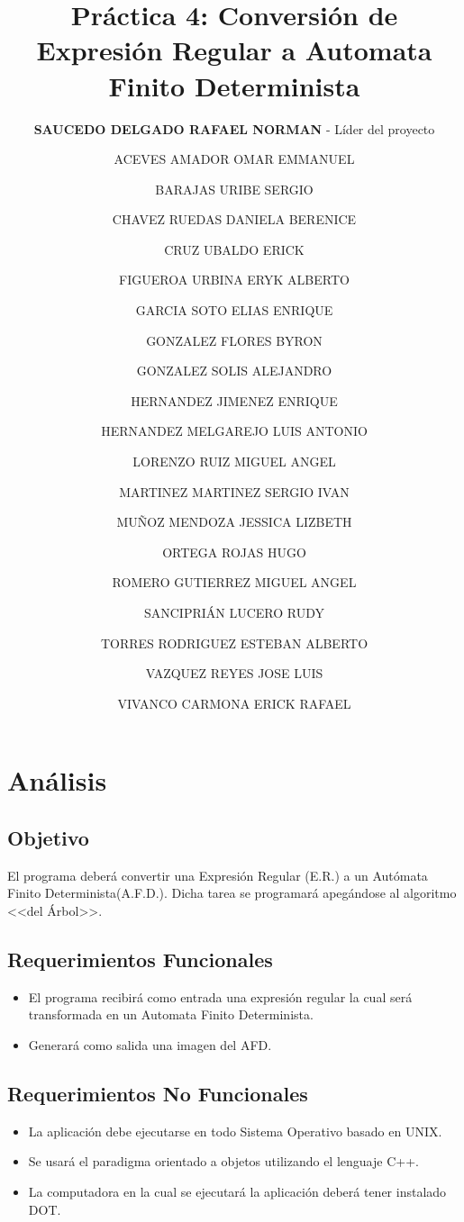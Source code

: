 \documentclass{report}
\title{{\bf Práctica 4:} Conversión de Expresión Regular a Automata Finito Determinista}
\author{{\bf SAUCEDO DELGADO RAFAEL NORMAN} {- Líder del proyecto}
\and ACEVES AMADOR OMAR EMMANUEL
\and BARAJAS URIBE SERGIO
\and CHAVEZ RUEDAS DANIELA BERENICE
\and CRUZ UBALDO ERICK
\and FIGUEROA URBINA ERYK ALBERTO
\and GARCIA SOTO ELIAS ENRIQUE
\and GONZALEZ FLORES BYRON
\and GONZALEZ SOLIS ALEJANDRO
\and HERNANDEZ JIMENEZ ENRIQUE
\and HERNANDEZ MELGAREJO LUIS ANTONIO
\and LORENZO RUIZ MIGUEL ANGEL
\and MARTINEZ MARTINEZ SERGIO IVAN
\and MUÑOZ MENDOZA JESSICA LIZBETH
\and ORTEGA ROJAS HUGO
\and ROMERO GUTIERREZ MIGUEL ANGEL
\and SANCIPRIÁN LUCERO RUDY
\and TORRES RODRIGUEZ ESTEBAN ALBERTO
\and VAZQUEZ REYES JOSE LUIS
\and VIVANCO CARMONA ERICK RAFAEL
}
\begin{document}
\maketitle
\tableofcontents

\chapter{Análisis}


\section{Objetivo}
El programa deberá convertir una Expresión Regular (E.R.) a un Autómata Finito Determinista(A.F.D.).
Dicha tarea se programará apegándose al algoritmo <<del Árbol>>.


\section{Requerimientos Funcionales}
\begin{itemize}
	\item El programa recibirá como entrada una expresión regular la cual será transformada en un Automata Finito Determinista.
	\item Generará como salida una imagen del AFD.
\end{itemize}


\section{Requerimientos No Funcionales}
\begin{itemize}
	\item La aplicación debe ejecutarse en todo Sistema Operativo basado en UNIX.
	\item Se usará el paradigma orientado a objetos utilizando el lenguaje C++.
	\item La computadora en la cual se ejecutará la aplicación deberá tener instalado DOT.
\end{itemize}
\end{document}
